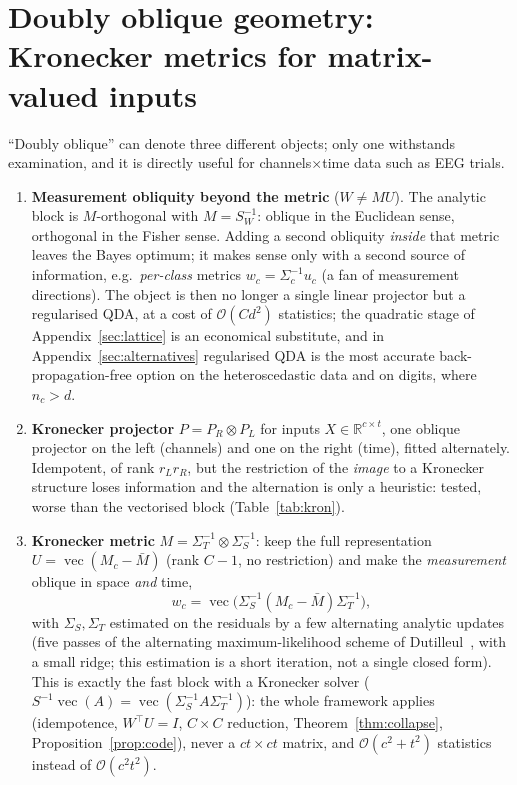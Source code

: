 \documentclass[11pt,a4paper]{article}
\theoremstyle{plain}
\theoremstyle{definition}
\theoremstyle{remark}
\newcommand{\R}{\mathbb R}
\newcommand{\vecop}{\operatorname{vec}}
\newcommand{\T}{\top}
\begin{document}
\section{Doubly oblique geometry: Kronecker metrics for matrix-valued inputs}
\label{sec:kron}
``Doubly oblique'' can denote three different objects; only one withstands
examination, and it is directly useful for channels$\times$time data such as
EEG trials.
\begin{enumerate}
  \item \textbf{Measurement obliquity beyond the metric} ($W\ne MU$). The
  analytic block is $M$-orthogonal with $M=S_W^{-1}$: oblique in the
  Euclidean sense, orthogonal in the Fisher sense. Adding a second obliquity
  \emph{inside} that metric leaves the Bayes optimum; it makes sense only with
  a second source of information, e.g.\ \emph{per-class} metrics
  $w_c=\Sigma_c^{-1}u_c$ (a fan of measurement directions). The object is then
  no longer a single linear projector but a regularised QDA, at a cost of
  $\mathcal O(Cd^2)$ statistics; the quadratic stage of
  Appendix~\ref{sec:lattice} is an economical substitute, and in
  Appendix~\ref{sec:alternatives} regularised QDA is the most accurate
  back-propagation-free option on the heteroscedastic data and on digits, where
  $n_c>d$.
  \item \textbf{Kronecker projector} $P=P_R\otimes P_L$ for inputs
  $X\in\R^{c\times t}$, one oblique projector on the left (channels) and one on
  the right (time), fitted alternately. Idempotent, of rank $r_Lr_R$, but the
  restriction of the \emph{image} to a Kronecker structure loses information
  and the alternation is only a heuristic: tested, worse than the vectorised
  block (Table~\ref{tab:kron}).
  \item \textbf{Kronecker metric} $M=\Sigma_T^{-1}\otimes\Sigma_S^{-1}$: keep
  the full representation $U=\vecop(M_c-\bar M)$ (rank $C-1$, no restriction)
  and make the \emph{measurement} oblique in space \emph{and} time,
  \begin{equation}
    w_c=\vecop\bigl(\Sigma_S^{-1}(M_c-\bar M)\Sigma_T^{-1}\bigr),
    \label{eq:kron}
  \end{equation}
  with $\Sigma_S,\Sigma_T$ estimated on the residuals by a few alternating
  analytic updates (five passes of the alternating maximum-likelihood
  scheme of Dutilleul~\cite{dutilleul1999}, with a small ridge; this
  estimation is a short iteration, not a single closed form). This is
  exactly the fast block with a Kronecker solver
  ($S^{-1}\vecop(A)=\vecop(\Sigma_S^{-1}A\Sigma_T^{-1})$): the whole framework
  applies (idempotence, $W^\T U=I$, $C\times C$ reduction,
  Theorem~\ref{thm:collapse}, Proposition~\ref{prop:code}), never a
  $ct\times ct$ matrix, and $\mathcal O(c^2+t^2)$ statistics instead of
  $\mathcal O(c^2t^2)$.
\end{enumerate}
\end{document}
